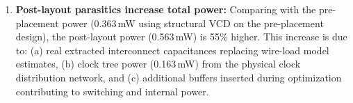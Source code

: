 \documentclass{article}
\begin{document}
\begin{tcolorbox}[colback=white, colframe=black, width=\textwidth, title=Answer 3.3]
\begin{enumerate}
\item \textbf{Post-layout parasitics increase total power:} Comparing with the pre-placement power (0.363\,mW using structural VCD on the pre-placement design), the post-layout power (0.563\,mW) is 55\% higher. This increase is due to: (a) real extracted interconnect capacitances replacing wire-load model estimates, (b) clock tree power (0.163\,mW) from the physical clock distribution network, and (c) additional buffers inserted during optimization contributing to switching and internal power.
\end{enumerate}

\end{tcolorbox}
\end{document}
